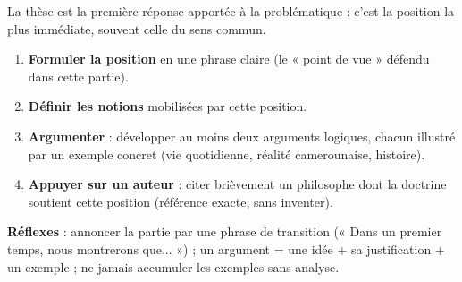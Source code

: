 \documentclass[11pt]{article}
\newcommand{\cle}[1]{{\popxbold\color{popdark}#1}}
\begin{document}
\begin{methode}
La \cle{thèse} est la première réponse apportée à la problématique : c'est la position la plus immédiate, souvent celle du sens commun.
\begin{enumerate}
\item \textbf{Formuler la position} en une phrase claire (le « point de vue » défendu dans cette partie).
\item \textbf{Définir les notions} mobilisées par cette position.
\item \textbf{Argumenter} : développer au moins deux arguments logiques, chacun illustré par un \cle{exemple concret} (vie quotidienne, réalité camerounaise, histoire).
\item \textbf{Appuyer sur un auteur} : citer brièvement un philosophe dont la doctrine soutient cette position (référence exacte, sans inventer).
\end{enumerate}
\textbf{Réflexes} : annoncer la partie par une phrase de transition (« Dans un premier temps, nous montrerons que... ») ; un argument = une idée + sa justification + un exemple ; ne jamais accumuler les exemples sans analyse.
\end{methode}
\end{document}
